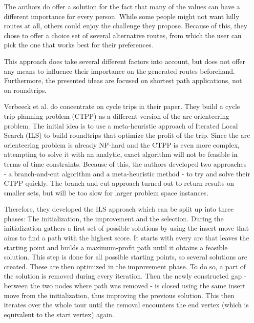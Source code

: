 The authors do offer a solution for the fact that many of the values can have a different importance for every person. 
While some people might not want hilly routes at all, others could enjoy the challenge they propose. 
Because of this, they chose to offer a choice set of several alternative routes, from which the user can pick the one that works best for their preferences. \cite{ehrgott_bi-objective_2012}

This approach does take several different factors into account, but does not offer any means to influence their importance on the generated routes beforehand.
Furthermore, the presented ideas are focused on shortest path applications, not on roundtrips.

Verbeeck et al. do concentrate on cycle trips in their paper. 
They build a \glqq cycle trip planning problem (CTPP)\grqq{} as a different version of the arc orienteering problem. 
The initial idea is to use a meta-heuristic approach of Iterated Local Search (ILS) to build roundtrips that optimize the profit of the trip.
Since the arc orienteering problem is already NP-hard and the CTPP is even more complex, attempting to solve it with an analytic, exact algorithm will not be feasible in terms of time constraints. 
Because of this, the authors developed two approaches - a branch-and-cut algorithm and a meta-heuristic method - to try and solve their CTPP quickly. 
The branch-and-cut approach turned out to return results on smaller sets, but will be too slow for larger problem space instances. \cite{verbeeck_extension_2014}

Therefore, they developed the ILS approach which can be split up into three phases:
The initialization, the improvement and the selection.
During the initialization gathers a first set of possible solutions by using the insert move that aims to find a path with the highest score.
It starts with every arc that leaves the starting point and builds a maximum-profit path until it obtains a feasible solution.
This step is done for all possible starting points, so several solutions are created.
These are then optimized in the improvement phase. 
To do so, a part of the solution is removed during every iteration.
Then the newly constructed gap - between the two nodes where path was removed - is closed using the same insert move from the initialization, thus improving the previous solution.
This then iterates over the whole tour until the removal encounters the end vertex (which is equivalent to the start vertex) again. \cite{verbeeck_extension_2014}

